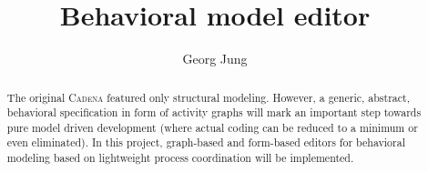 \documentclass[a4paper]{article}
\title{Behavioral model editor}
\author{Georg Jung}
\begin{document}
\maketitle

\begin{abstract}
  The original \textsc{Cadena} featured only structural
  modeling. However, a generic, abstract, behavioral specification in
  form of activity graphs will mark an important step towards pure
  model driven development (where actual coding can be reduced to a
  minimum or even eliminated). In this project, graph-based and
  form-based editors for behavioral modeling based on lightweight
  process coordination will be implemented.
\end{abstract}
\end{document}
